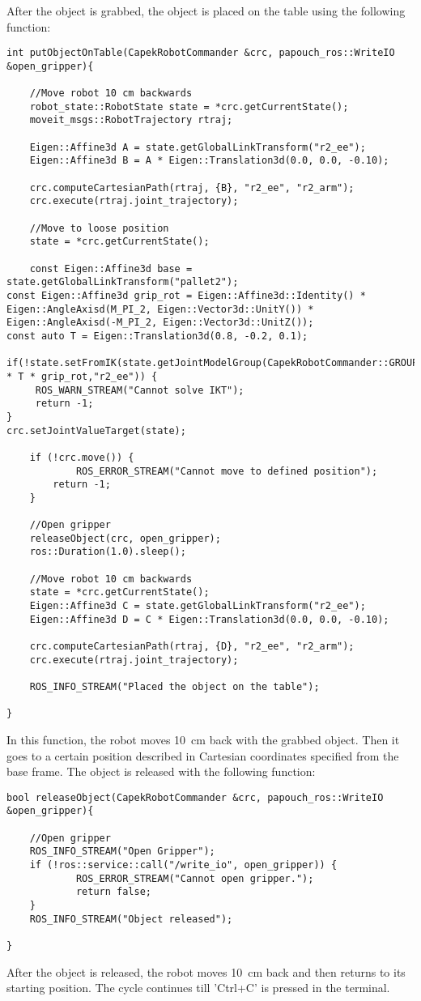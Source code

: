 \documentclass[11pt,a4paper]{report}
\begin{document}
After the object is grabbed, the object is placed on the table using the following function:
\begin{verbatim}
int putObjectOnTable(CapekRobotCommander &crc, papouch_ros::WriteIO &open_gripper){

	//Move robot 10 cm backwards
	robot_state::RobotState state = *crc.getCurrentState();
	moveit_msgs::RobotTrajectory rtraj;

	Eigen::Affine3d A = state.getGlobalLinkTransform("r2_ee");
	Eigen::Affine3d B = A * Eigen::Translation3d(0.0, 0.0, -0.10);
	
	crc.computeCartesianPath(rtraj, {B}, "r2_ee", "r2_arm");
	crc.execute(rtraj.joint_trajectory);

	//Move to loose position
	state = *crc.getCurrentState();

	const Eigen::Affine3d base = state.getGlobalLinkTransform("pallet2");
const Eigen::Affine3d grip_rot = Eigen::Affine3d::Identity() *
Eigen::AngleAxisd(M_PI_2, Eigen::Vector3d::UnitY()) *
Eigen::AngleAxisd(-M_PI_2, Eigen::Vector3d::UnitZ());
const auto T = Eigen::Translation3d(0.8, -0.2, 0.1);

if(!state.setFromIK(state.getJointModelGroup(CapekRobotCommander::GROUP_R2_ARM),base
* T * grip_rot,"r2_ee")) {
     ROS_WARN_STREAM("Cannot solve IKT");
     return -1;
}
crc.setJointValueTarget(state);

	if (!crc.move()) {
		    ROS_ERROR_STREAM("Cannot move to defined position");
		return -1;
	}

	//Open gripper
	releaseObject(crc, open_gripper);
	ros::Duration(1.0).sleep();

	//Move robot 10 cm backwards
	state = *crc.getCurrentState();
	Eigen::Affine3d C = state.getGlobalLinkTransform("r2_ee");
	Eigen::Affine3d D = C * Eigen::Translation3d(0.0, 0.0, -0.10);

	crc.computeCartesianPath(rtraj, {D}, "r2_ee", "r2_arm");
	crc.execute(rtraj.joint_trajectory);

	ROS_INFO_STREAM("Placed the object on the table");

}
\end{verbatim}
In this function, the robot moves 10~cm back with the grabbed object. Then it goes to a certain position described in Cartesian coordinates specified from the base frame. The object is released with the following function:
\begin{verbatim}
bool releaseObject(CapekRobotCommander &crc, papouch_ros::WriteIO &open_gripper){
	
	//Open gripper
	ROS_INFO_STREAM("Open Gripper");
	if (!ros::service::call("/write_io", open_gripper)) {
       		ROS_ERROR_STREAM("Cannot open gripper.");
        	return false;
	}
	ROS_INFO_STREAM("Object released");
	
}
\end{verbatim}
After the object is released, the robot moves 10~cm back and then returns to its starting position. The cycle continues till 'Ctrl+C' is pressed in the terminal.
\newpage
\end{document}
